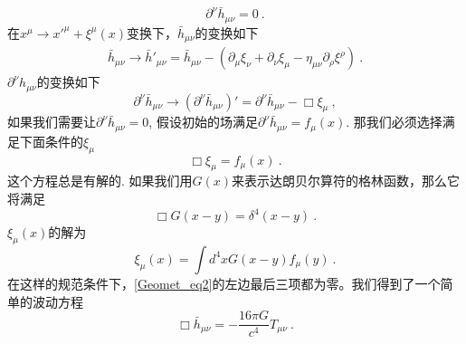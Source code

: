 \begin{equation}
\partial^\nu \bar h_{\mu\nu} = 0 ~. 
\end{equation}
在$x^\mu\rightarrow x'^\mu+\xi^\mu(x)$变换下，$\bar h_{\mu\nu}$的变换如下
\begin{align}
\bar h_{\mu\nu} \rightarrow \bar h'_{\mu\nu} = \bar h_{\mu\nu} - (\partial_\mu\xi_\nu+ \partial_\nu\xi_\mu - \eta_{\mu\nu} \partial_\rho\xi^\rho )~. 
\end{align}
$\partial^\nu h_{\mu\nu}$的变换如下
\begin{equation}
\partial^\nu \bar h_{\mu\nu} \rightarrow (\partial^\nu \bar h_{\mu\nu})' = \partial^\nu \bar h_{\mu\nu} - \Box \xi_\mu ~, 
\end{equation}
如果我们需要让$\partial^\nu \bar h_{\mu\nu} = 0$, 假设初始的场满足$\partial^\nu \bar h_{\mu\nu} = f_\mu (x)$. 那我们必须选择满足下面条件的$\xi_\mu$
\begin{equation}
\Box \xi_\mu = f_\mu (x) ~. 
\end{equation}
这个方程总是有解的. 如果我们用$G(x)$来表示达朗贝尔算符的格林函数，那么它将满足
\begin{equation}
\Box G(x-y) = \delta^4 (x-y) ~.
\end{equation}
$\xi_\mu(x)$的解为
\begin{equation}
\xi_\mu(x) = \int d^4 x G(x-y) f_\mu(y) ~.
\end{equation}
在这样的规范条件下，\autoref{Geomet_eq2}的左边最后三项都为零。我们得到了一个简单的波动方程
\begin{equation}
\Box \bar h_{\mu\nu} = - \frac{16\pi G}{c^4} T_{\mu\nu} ~. 
\end{equation}














